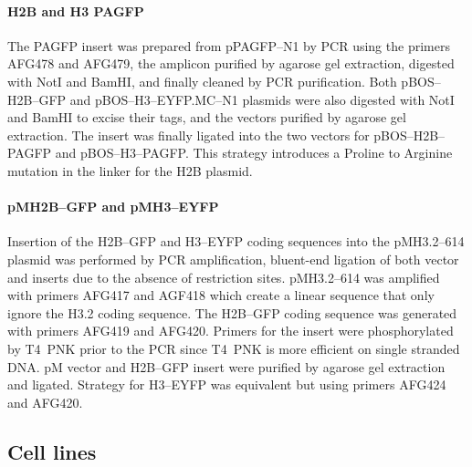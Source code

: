     \paragraph{H2B and H3 PAGFP}
      The PAGFP insert was prepared from pPAGFP--N1 by PCR using the
      primers AFG478 and AFG479, the amplicon purified by agarose gel
      extraction, digested with NotI and BamHI, and finally cleaned by
      PCR purification.
      Both pBOS--H2B--GFP and pBOS--H3--EYFP.MC--N1 plasmids were also
      digested with NotI and BamHI to excise their tags, and the vectors
      purified by agarose gel extraction. The insert was finally ligated
      into the two vectors for pBOS--H2B--PAGFP and pBOS--H3--PAGFP.
      This strategy introduces a Proline to Arginine mutation in the
      linker for the H2B plasmid.

    \paragraph{pMH2B--GFP and pMH3--EYFP}
      Insertion of the H2B--GFP and H3--EYFP coding sequences into the
      pMH3.2--614 plasmid was performed by PCR amplification, bluent-end
      ligation of both vector and inserts due to the absence of restriction
      sites. pMH3.2--614 was amplified with primers AFG417 and AGF418 which
      create a linear sequence that only ignore the H3.2 coding sequence.
      The H2B--GFP coding sequence was generated with primers AFG419 and AFG420.
      Primers for the insert were phosphorylated by T4~PNK prior to the PCR
      since T4~PNK is more efficient on single stranded DNA. pM vector and
      H2B--GFP insert were purified by agarose gel extraction and ligated.
      Strategy for H3--EYFP was equivalent but using primers AFG424 and AFG420.

  \subsection{Cell lines}

